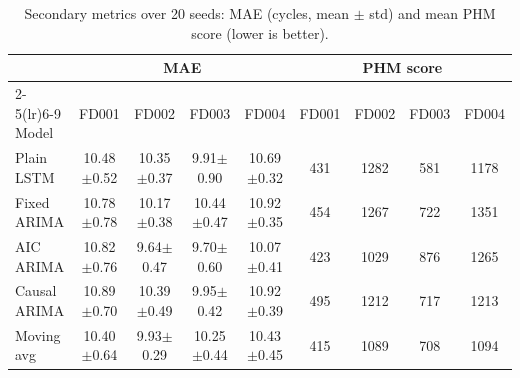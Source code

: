 \documentclass[conference]{IEEEtran}
\begin{document}
\begin{table}[t]
\centering
\caption{Secondary metrics over 20 seeds: MAE (cycles, mean $\pm$ std) and mean PHM score (lower is better).}
\label{tab:metrics}
\footnotesize
\setlength{\tabcolsep}{4pt}
\begin{tabular}{lcccccccc}
\toprule
 & \multicolumn{4}{c}{MAE} & \multicolumn{4}{c}{PHM score} \\
\cmidrule(lr){2-5}\cmidrule(lr){6-9}
Model & FD001 & FD002 & FD003 & FD004 & FD001 & FD002 & FD003 & FD004 \\
\midrule
Plain LSTM & 10.48{\tiny$\pm$0.52} & 10.35{\tiny$\pm$0.37} & 9.91{\tiny$\pm$0.90} & 10.69{\tiny$\pm$0.32} & 431 & 1282 & 581 & 1178 \\
Fixed ARIMA & 10.78{\tiny$\pm$0.78} & 10.17{\tiny$\pm$0.38} & 10.44{\tiny$\pm$0.47} & 10.92{\tiny$\pm$0.35} & 454 & 1267 & 722 & 1351 \\
AIC ARIMA & 10.82{\tiny$\pm$0.76} & 9.64{\tiny$\pm$0.47} & 9.70{\tiny$\pm$0.60} & 10.07{\tiny$\pm$0.41} & 423 & 1029 & 876 & 1265 \\
Causal ARIMA & 10.89{\tiny$\pm$0.70} & 10.39{\tiny$\pm$0.49} & 9.95{\tiny$\pm$0.42} & 10.92{\tiny$\pm$0.39} & 495 & 1212 & 717 & 1213 \\
Moving avg & 10.40{\tiny$\pm$0.64} & 9.93{\tiny$\pm$0.29} & 10.25{\tiny$\pm$0.44} & 10.43{\tiny$\pm$0.45} & 415 & 1089 & 708 & 1094 \\
\bottomrule
\end{tabular}
\end{table}
\end{document}
